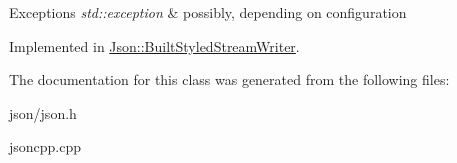 \begin{DoxyExceptions}{Exceptions}
{\em std\+::exception} & possibly, depending on configuration \\
\hline
\end{DoxyExceptions}


Implemented in \hyperlink{structJson_1_1BuiltStyledStreamWriter_a823cdb1afabb6b0d5f39bcd5a6a6f747}{Json\+::\+Built\+Styled\+Stream\+Writer}.



The documentation for this class was generated from the following files\+:\begin{DoxyCompactItemize}
\item 
json/json.\+h\item 
jsoncpp.\+cpp\end{DoxyCompactItemize}
